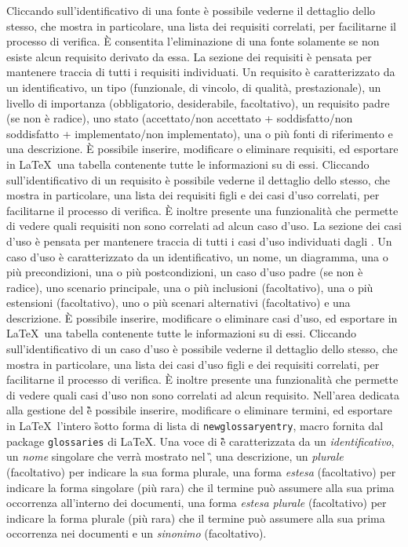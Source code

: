Cliccando sull'identificativo di una fonte è possibile vederne il dettaglio dello stesso, che mostra in particolare, una lista dei requisiti correlati, per facilitarne il processo di verifica.
\`E consentita l'eliminazione di una fonte solamente se non esiste alcun requisito derivato da essa.
La sezione dei requisiti è pensata per mantenere traccia di tutti i requisiti individuati.
Un requisito è caratterizzato da un identificativo, un tipo (funzionale, di vincolo, di qualità, prestazionale), un livello di importanza (obbligatorio, desiderabile, facoltativo),
un requisito padre (se non è radice), uno stato (accettato/non accettato + soddisfatto/non soddisfatto + implementato/non implementato), una o più fonti di riferimento e una descrizione. \`{E} possibile inserire, modificare o eliminare requisiti, ed esportare in \LaTeX\ una tabella contenente tutte le informazioni su di essi.
Cliccando sull'identificativo di un requisito è possibile vederne il dettaglio dello stesso, che mostra in particolare, una lista dei requisiti figli e dei casi d'uso correlati, per facilitarne il processo di verifica.
\`E inoltre presente una funzionalità che permette di vedere quali requisiti non sono correlati ad alcun caso d'uso.
La sezione dei casi d'uso è pensata per mantenere traccia di tutti i casi d'uso individuati dagli \rAs.
Un caso d'uso è caratterizzato da un identificativo, un nome, un diagramma, una o più precondizioni, una o più postcondizioni, un caso d'uso padre (se non è radice), uno scenario principale, una o più inclusioni (facoltativo), una o più estensioni (facoltativo), uno o più scenari alternativi (facoltativo) e una descrizione. \`{E} possibile inserire, modificare o eliminare casi d'uso, ed esportare in \LaTeX\ una tabella contenente tutte le informazioni su di essi.
Cliccando sull'identificativo di un caso d'uso è possibile vederne il dettaglio dello stesso, che mostra in particolare, una lista dei casi d'uso figli e dei requisiti correlati, per facilitarne il processo di verifica.
\`E inoltre presente una funzionalità che permette di vedere quali casi d'uso non sono correlati ad alcun requisito.
\subsubsubsubsection{\G}
Nell'area dedicata alla gestione del \G è possibile inserire, modificare o eliminare termini, ed esportare in \LaTeX\ l’intero \G sotto forma di lista di \texttt{newglossaryentry}, macro fornita dal package \texttt{glossaries} di \LaTeX.
Una voce di \G è caratterizzata da un \emph{identificativo}, un \emph{nome} singolare che verrà mostrato nel \G, una descrizione, un \emph{plurale} (facoltativo) per indicare la sua forma plurale, una forma \emph{estesa} (facoltativo) per indicare la forma singolare (più rara) che il termine può assumere alla sua prima occorrenza all'interno dei documenti, una forma \emph{estesa plurale} (facoltativo) per indicare la forma plurale (più rara) che il termine può assumere alla sua prima occorrenza nei documenti e un \emph{sinonimo} (facoltativo).
